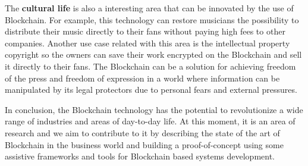 The \textbf{cultural life} is also a interesting area that can be innovated by the use of Blockchain. For example, this technology can restore musicians the possibility to distribute their music directly to their fans without paying high fees to other companies. Another use case related with this area is the intellectual property copyright so the owners can save their work encrypted on the Blockchain and sell it directly to their fans. The Blockchain can be a solution for achieving freedom of the press and freedom of expression in a world where information can be manipulated by its legal protectors due to personal fears and 
external pressures.

In conclusion, the Blockchain technology has the potential to revolutionize a wide range of industries and areas of day-to-day life. At this moment, it is an area of research and we aim to contribute to it by describing the state of the art of Blockchain in the business world and building a proof-of-concept using some assistive frameworks and tools for Blockchain based systems development.








 


